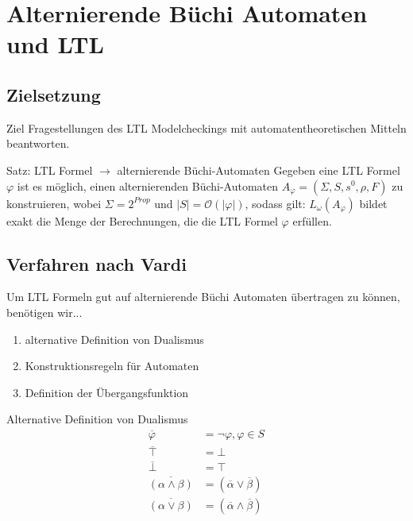\section{Alternierende Büchi Automaten und LTL}

\subsection{Zielsetzung}
\begin{frame}{\insertsubsection}
\begin{block}{Ziel}
    Fragestellungen des LTL Modelcheckings mit automatentheoretischen Mitteln beantworten.
\end{block}
\vspace*{1.5em}
\begin{block}{Satz: LTL Formel $\rightarrow$ alternierende Büchi-Automaten \cite{vardi+96}}
    Gegeben eine LTL Formel $\varphi$ ist es möglich, einen alternierenden Büchi-Automaten $A_\varphi = (\Sigma, S, s^0, \rho, F)$ zu konstruieren, wobei $\Sigma = 2^{Prop}$ und $|S| = \mathcal{O}(|\varphi|)$, sodass gilt: $L_\omega(A_\varphi)$ bildet exakt die Menge der Berechnungen, die die LTL Formel $\varphi$ erfüllen.
\end{block}
\end{frame}

\subsection{Verfahren nach Vardi \cite{vardi+96}}
\begin{frame}{\insertsubsection}
Um LTL Formeln gut auf alternierende Büchi Automaten übertragen zu können, benötigen wir...
\vspace*{1em}
\begin{enumerate}
    \setlength\itemsep{1.5em}
    \item alternative Definition von Dualismus
    \item Konstruktionsregeln für Automaten
    \item Definition der Übergangsfunktion
\end{enumerate}
\end{frame}

\begin{frame}{\insertsubsection}
\begin{block}{Alternative Definition von Dualismus}
    \vspace*{-1em}
    \begin{equation*}
    \label{aba-zu-ltl:dualismus}
    \begin{split}
        \overline{\varphi} &= \lnot\varphi, \varphi \in S\\
        \overline{\top} &= \bot\\
        \overline{\bot} &= \top\\
        \overline{(\alpha \land \beta)} &= (\overline{\alpha} \lor \overline{\beta})\\
        \overline{(\alpha \lor \beta)} &= (\overline{\alpha} \land \overline{\beta})
    \end{split}
    \end{equation*}
\end{block}
\end{frame}

